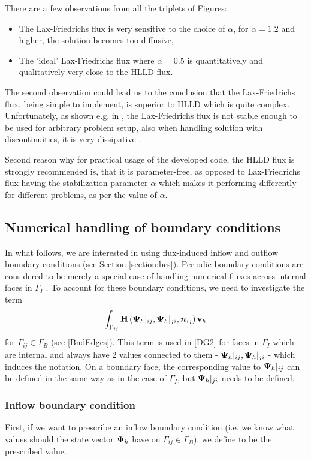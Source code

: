 There are a few observations from all the triplets of Figures:
\begin{itemize}
\item The Lax-Friedrichs flux is very sensitive to the choice of $\alpha$, for $\alpha = 1.2$ and higher, the solution becomes too diffusive,
\item The 'ideal' Lax-Friedrichs flux where $\alpha = 0.5$ is quantitatively and qualitatively very close to the HLLD flux.
\end{itemize}
The second observation could lead us to the conclusion that the Lax-Friedrichs flux, being simple to implement, is superior to HLLD which is quite complex. Unfortunately, as shown e.g. in \cite{lfunstable}, the Lax-Friedrichs flux is not stable enough to be used for arbitrary problem setup, also when handling solution with discontinuities, it is very dissipative \cite{lfdisc}.

Second reason why for practical usage of the developed code, the HLLD flux is strongly recommended is, that it is parameter-free, as opposed to Lax-Friedrichs flux having the stabilization parameter $\alpha$ which makes it performing differently for different problems, as per the value of $\alpha$.

\subsection{Numerical handling of boundary conditions}
In what follows, we are interested in using flux-induced inflow and outflow boundary conditions (see Section \cref{section:bcs}). Periodic boundary conditions are considered to be merely a special case of handling numerical fluxes across internal faces in $\Gamma_I$ .
To account for these boundary conditions, we need to investigate the term
$$
\int_{\Gamma_{ij}} \mathrm{\mathbf{H}}\left({\mathrm{\mathbf{\Psi}}_h}|_{ij}, {\mathrm{\mathbf{\Psi}}_h}|_{ji}, \mbox{\boldmath $n$}_{ij}\right) \mathrm{\mathbf{v}}_h
$$
for $\Gamma_{ij} \in \Gamma_B$ (see \cref{BndEdges}).
This term is used in \cref{DG2} for faces in $\Gamma_I$ which are internal and always have 2 values connected to them - $\mathrm{\mathbf{\Psi}}_h|_{ij}, {\mathrm{\mathbf{\Psi}}_h}|_{ji}$ - which induces the notation. On a boundary face, the corresponding value to ${\mathrm{\mathbf{\Psi}}_h}|_{ij}$ can be defined in the same way as in the case of $\Gamma_I$, but ${\mathrm{\mathbf{\Psi}}_h}|_{ji}$ needs to be defined.
\subsubsection{Inflow boundary condition}
First, if we want to prescribe an inflow boundary condition (i.e. we know what values should the state vector $\mathrm{\mathbf{\Psi}}_h$ have on ${\Gamma_{ij}}\in\Gamma_B$), we define
\be
\label{BC1} 
\ee
to be the prescribed value.

